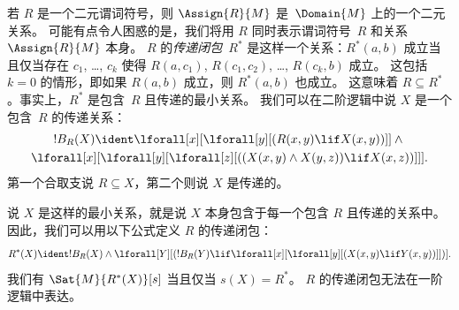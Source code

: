 \documentclass[../../../include/open-logic-section]{subfiles}
\begin{document}
\begin{ex}
若 $R$ 是一个二元谓词符号，则 $\Assign{R}{M}$ 是~$\Domain{M}$ 上的一个二元关系。
可能有点令人困惑的是，我们将用 $R$ 同时表示谓词符号~$R$ 和关系~$\Assign{R}{M}$ 本身。
$R$ 的\emph{传递闭包}~$R^*$ 是这样一个关系：$R^*(a,b)$ 成立当且仅当存在 $c_1$, \dots, $c_k$ 使得
$R(a,c_1)$, $R(c_1, c_2)$, \dots, $R(c_k,b)$ 成立。
这包括 $k = 0$ 的情形，即如果 $R(a,b)$ 成立，则 $R^*(a,b)$ 也成立。
这意味着 $R \subseteq R^*$。事实上，$R^*$ 是包含~$R$ 且传递的最小关系。
我们可以在二阶逻辑中说 $X$ 是一个包含~$R$ 的传递关系：
\begin{multline*}
  !B_R(X) \ident \lforall[x][\lforall[y][(R(x,y) \lif X(x, y))]] \land {}\\
\lforall[x][\lforall[y][\lforall[z][((X(x,y) \land X(y,z)) \lif X(x,
      z))]]].
\end{multline*}
第一个合取支说 $R \subseteq X$，第二个则说 $X$ 是传递的。

说 $X$ 是这样的最小关系，就是说 $X$ 本身包含于每一个包含 $R$ 且传递的关系中。
因此，我们可以用以下公式定义 $R$ 的传递闭包：
\[
R^*(X) \ident !B_R(X) \land \lforall[Y][(!B_R(Y) \lif
  \lforall[x][\lforall[y][(X(x, y) \lif Y(x,y))]])].
\]
我们有 $\Sat{M}{R^*(X)}[s]$ 当且仅当 $s(X) = R^*$。
$R$ 的传递闭包无法在一阶逻辑中表达。
\end{ex}
\end{document}
